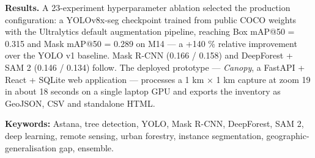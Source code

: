 \textbf{Results.} A 23-experiment hyperparameter ablation selected the production configuration: a YOLOv8x-seg checkpoint trained from public COCO weights with the Ultralytics default augmentation pipeline, reaching Box mAP@50 = 0.315 and Mask mAP@50 = 0.289 on M14 --- a +140 \% relative improvement over the YOLO v1 baseline. Mask R-CNN (0.166 / 0.158) and DeepForest + SAM 2 (0.146 / 0.134) follow. The deployed prototype --- \emph{Canopy}, a FastAPI + React + SQLite web application --- processes a 1 km × 1 km capture at zoom 19 in about 18 seconds on a single laptop GPU and exports the inventory as GeoJSON, CSV and standalone HTML.

\textbf{Keywords:} Astana, tree detection, YOLO, Mask R-CNN, DeepForest, SAM 2, deep learning, remote sensing, urban forestry, instance segmentation, geographic-generalisation gap, ensemble.

\newpage

